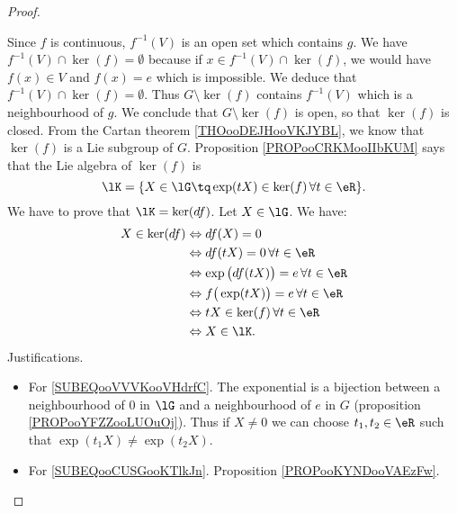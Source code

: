 \begin{proof}
\begin{subproof}
		Since \( f\) is continuous, \( f^{-1}(V)\) is an open set which contains \( g\). We have \( f^{-1}(V)\cap \ker(f)=\emptyset\) because if \( x\in f^{-1}(V)\cap\ker(f)\), we would have \( f(x)\in V\) and \( f(x)=e\) which is impossible. We deduce that \( f^{-1}(V)\cap\ker(f)=\emptyset\). Thus \( G\setminus\ker(f)\) contains \( f^{-1}(V)\) which is a neighbourhood of \( g\). We conclude that \( G\setminus \ker(f)\) is open, so that \( \ker(f)\) is closed.
		From the Cartan theorem \ref{THOooDEJHooVKJYBL}, we know that \( \ker(f)\) is a Lie subgroup of \( G\).
		Proposition \ref{PROPooCRKMooIIbKUM} says that the Lie algebra of \( \ker(f)\) is
		\begin{equation}
			\lK=\{ X\in \lG\tq \exp(tX)\in \ker(f)\,\forall t\in \eR \}.
		\end{equation}
		We have to prove that \( \lK=\ker(df)\). Let \( X\in \lG\). We have:
		\begin{subequations}
			\begin{align}
				X\in\ker(df) & \Leftrightarrow df(X)=0                                                                      \\
				             & \Leftrightarrow df(tX)=0\,\forall t\in \eR                                                   \\
				             & \Leftrightarrow \exp\big( df(tX) \big)=e\,\forall t\in \eR       \label{SUBEQooVVVKooVHdrfC} \\
				             & \Leftrightarrow f\big( \exp(tX) \big)=e\,\forall t\in \eR  \label{SUBEQooCUSGooKTlkJn}       \\
				             & \Leftrightarrow tX\in\ker(f)\,\forall t\in \eR                                               \\
				             & \Leftrightarrow X\in\lK.
			\end{align}
		\end{subequations}
		Justifications.
		\begin{itemize}
			\item For \eqref{SUBEQooVVVKooVHdrfC}. The exponential is a bijection between a neighbourhood of \( 0\) in \( \lG\) and a neighbourhood of \( e\) in \( G\) (proposition \ref{PROPooYFZZooLUOuOj}). Thus if \( X\neq 0\) we can choose \( t_1,t_2\in \eR\) such that \( \exp(t_1X)\neq \exp(t_2X)\).
			\item For \eqref{SUBEQooCUSGooKTlkJn}. Proposition \ref{PROPooKYNDooVAEzFw}.
		\end{itemize}
	\end{subproof}
\end{proof}

